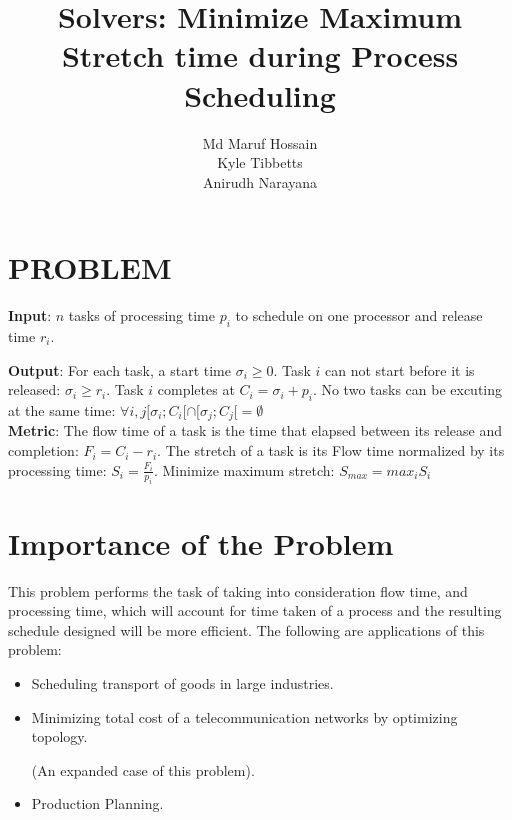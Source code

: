 \documentclass[11pt, conference, onecolumn]{IEEEtran}
\begin{document}
\title{Solvers: Minimize Maximum Stretch time during Process Scheduling}

\author{
Md Maruf Hossain \\
Kyle Tibbetts \\
Anirudh Narayana \\
}

\maketitle
\section{PROBLEM}


\textbf{Input}: $n$ tasks of processing time $p_i$ to schedule on one processor and release time $r_i$. 


\textbf{Output}: For each task, a start time $\sigma_i \geq 0$. Task $i$ can not start before it is released: $\sigma_i \geq r_i$. Task $i$ completes at $C_i = \sigma_i + p_i$. No two tasks can be excuting at the same time: $\forall i,j [\sigma_i;C_i[ \cap [\sigma_j;C_j[ = \emptyset $ \\ 

\textbf{Metric}: The flow time of a task is the time that elapsed between its release and completion: $F_i = C_i - r_i$. The stretch of a task is its Flow time normalized by its processing time: $S_i = \frac{F_i}{p_i}$. Minimize maximum stretch: $S_{max} = max_i S_i$


\section{Importance of the Problem}

This problem performs the task of taking into consideration flow time, and processing time, which will account for time taken of a process and the resulting schedule designed will be more efficient. The following are applications of this problem:
\begin{itemize}
    \item Scheduling transport of goods in large industries.
    \item Minimizing total cost of a telecommunication networks by optimizing topology.
    
    (An expanded case of this problem).
    \item Production Planning.
\end{itemize}
\end{document}
